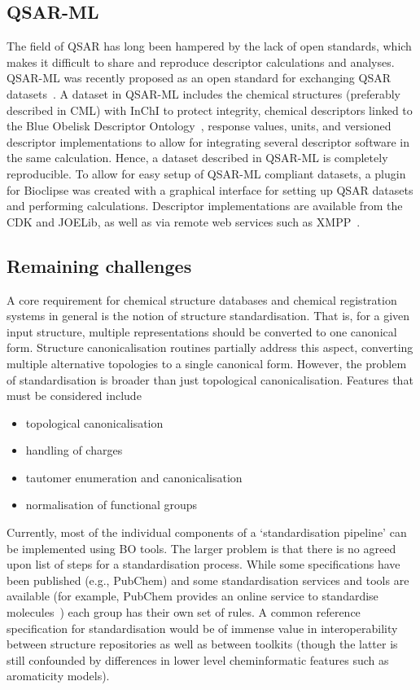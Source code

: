 \documentclass[10pt]{bmc_article}
\newenvironment{bmcformat}{\fussy\setboolean{publ}{true}}{\fussy}
\begin{document}
\begin{bmcformat}
\subsection*{QSAR-ML}
The field of QSAR has long been hampered by the lack of open
standards, which makes it difficult to share and reproduce descriptor
calculations and analyses. QSAR-ML was recently proposed as an open
standard for exchanging QSAR datasets~\cite{Spjuth:2010uq}. A dataset
in QSAR-ML includes the chemical structures (preferably described in
CML) with InChI to protect integrity, chemical descriptors linked to
the Blue Obelisk Descriptor Ontology~\cite{bodo}, response values,
units, and versioned descriptor implementations to allow for
integrating several descriptor software in the same calculation.
Hence, a dataset described in QSAR-ML is completely reproducible. To
allow for easy setup of QSAR-ML compliant datasets, a plugin for
Bioclipse was created with a graphical interface for
setting up QSAR datasets and performing calculations. Descriptor
implementations are available from the CDK and JOELib, as well
as via remote web services such as XMPP~\cite{Wagener:2009uq}.

\subsection*{Remaining challenges}

A core requirement for chemical structure databases and chemical
registration systems in general is the notion of structure
standardisation.  That is,  for a given input structure, multiple
representations should be converted to one canonical form.
Structure canonicalisation routines partially address this aspect,
converting multiple alternative topologies to a single canonical
form. However, the problem of standardisation is broader than just
topological canonicalisation. Features that must be considered include
\begin{itemize}
\item topological canonicalisation
\item handling of charges
\item tautomer enumeration and canonicalisation
\item normalisation of functional groups
\end{itemize}
Currently, most of the individual components of a `standardisation
pipeline' can be implemented using BO tools. The larger problem is
that there is no agreed upon list of steps for a standardisation
process. While some specifications have been published (e.g., PubChem)
and some standardisation services and tools are available (for
example, PubChem
provides an online service to standardise
molecules~\cite{WebPubChemStandardizer})
each group has their own set of rules. A
common reference specification for standardisation would be of immense
value in interoperability between structure repositories as well as
between toolkits (though the latter is still confounded by differences
in lower level cheminformatic features such as aromaticity models).


\end{bmcformat}
\end{document}
